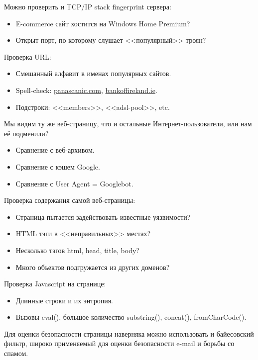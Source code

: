 \documentclass[10pt, a5paper]{article}
\begin{document}
Можно проверить и TCP/IP stack fingerprint сервера:

\begin{itemize}
  \item E-commerce сайт хостится на Windows Home Premium?
  \item Открыт порт, по которому слушает <<популярный>> троян?
\end{itemize}

Проверка URL:

\begin{itemize}
  \item Смешанный алфавит в именах популярных сайтов.
  \item Spell-check: \url{panascanic.com}, \url{bankoffireland.ie}.
  \item Подстроки: <<members>>, <<adsl-pool>>, etc.
\end{itemize}

Мы видим ту же веб-страницу, что и остальные Интернет-\linebreak пользователи,
или нам её подменили?

\begin{itemize}
  \item Сравнение с веб-архивом.
  \item Сравнение с кэшем Google.
  \item Сравнение с User Agent = Googlebot.
\end{itemize}

Проверка содержания самой веб-страницы:

\begin{itemize}
  \item Страница пытается задействовать известные уязвимости?
  \item HTML тэги в <<неправильных>> местах?
  \item Несколько тэгов html, head, title, body?
  \item Много объектов подгружается из других доменов?
\end{itemize}

Проверка Javascript на странице:

\begin{itemize}
  \item Длинные строки и их энтропия.
  \item Вызовы eval(), большое количество substring(), concat(), \linebreak fromCharCode().
\end{itemize}

Для оценки безопасности страницы наверняка можно использовать и
байесовский фильтр, широко применяемый для оценки безопасности e-mail
и борьбы со спамом.
\end{document}
